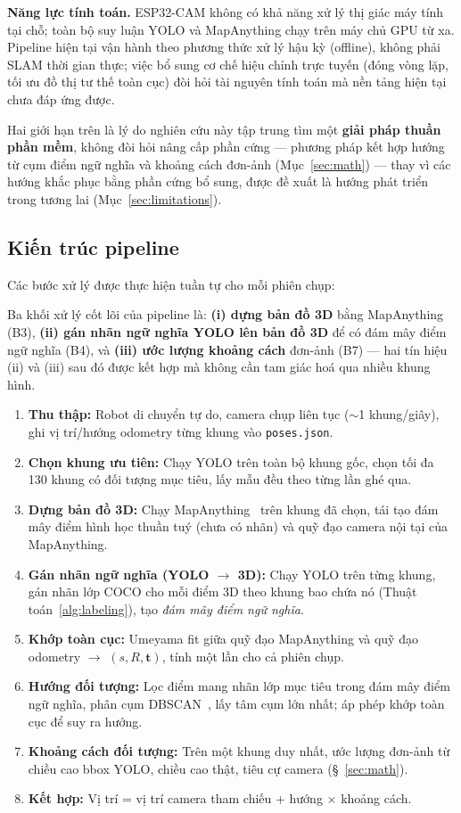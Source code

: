 \documentclass[10pt,a4paper,twocolumn]{article}
\begin{document}
\textbf{Năng lực tính toán.} ESP32-CAM không có khả năng xử lý thị giác máy tính tại chỗ; toàn bộ suy luận YOLO và MapAnything chạy trên máy chủ GPU từ xa. Pipeline hiện tại vận hành theo phương thức xử lý hậu kỳ (offline), không phải SLAM thời gian thực; việc bổ sung cơ chế hiệu chỉnh trực tuyến (đóng vòng lặp, tối ưu đồ thị tư thế toàn cục) đòi hỏi tài nguyên tính toán mà nền tảng hiện tại chưa đáp ứng được.

Hai giới hạn trên là lý do nghiên cứu này tập trung tìm một \textbf{giải pháp thuần phần mềm}, không đòi hỏi nâng cấp phần cứng — phương pháp kết hợp hướng từ cụm điểm ngữ nghĩa và khoảng cách đơn-ảnh (Mục~\ref{sec:math}) — thay vì các hướng khắc phục bằng phần cứng bổ sung, được đề xuất là hướng phát triển trong tương lai (Mục~\ref{sec:limitations}).

\subsection{Kiến trúc pipeline}

Các bước xử lý được thực hiện tuần tự cho mỗi phiên chụp:

Ba khối xử lý cốt lõi của pipeline là: \textbf{(i) dựng bản đồ 3D} bằng MapAnything (B3), \textbf{(ii) gán nhãn ngữ nghĩa YOLO lên bản đồ 3D} để có đám mây điểm ngữ nghĩa (B4), và \textbf{(iii) ước lượng khoảng cách} đơn-ảnh (B7) — hai tín hiệu (ii) và (iii) sau đó được kết hợp mà không cần tam giác hoá qua nhiều khung hình.

\begin{enumerate}[label=\textbf{B\arabic*.},leftmargin=*,itemsep=0.15em]
    \item \textbf{Thu thập:} Robot di chuyển tự do, camera chụp liên tục ($\sim$1 khung/giây), ghi vị trí/hướng odometry từng khung vào \texttt{poses.json}.
    \item \textbf{Chọn khung ưu tiên:} Chạy YOLO trên toàn bộ khung gốc, chọn tối đa 130 khung có đối tượng mục tiêu, lấy mẫu đều theo từng lần ghé qua.
    \item \textbf{Dựng bản đồ 3D:} Chạy MapAnything~\cite{mapanything} trên khung đã chọn, tái tạo đám mây điểm hình học thuần tuý (chưa có nhãn) và quỹ đạo camera nội tại của MapAnything.
    \item \textbf{Gán nhãn ngữ nghĩa (YOLO $\to$ 3D):} Chạy YOLO trên từng khung, gán nhãn lớp COCO cho mỗi điểm 3D theo khung bao chứa nó (Thuật toán~\ref{alg:labeling}), tạo \emph{đám mây điểm ngữ nghĩa}.
    \item \textbf{Khớp toàn cục:} Umeyama fit giữa quỹ đạo MapAnything và quỹ đạo odometry $\to$ $(s, R, \mathbf{t})$, tính một lần cho cả phiên chụp.
    \item \textbf{Hướng đối tượng:} Lọc điểm mang nhãn lớp mục tiêu trong đám mây điểm ngữ nghĩa, phân cụm DBSCAN~\cite{dbscan}, lấy tâm cụm lớn nhất; áp phép khớp toàn cục để suy ra hướng.
    \item \textbf{Khoảng cách đối tượng:} Trên một khung duy nhất, ước lượng đơn-ảnh từ chiều cao bbox YOLO, chiều cao thật, tiêu cự camera (\S~\ref{sec:math}).
    \item \textbf{Kết hợp:} Vị trí = vị trí camera tham chiếu + hướng $\times$ khoảng cách.
\end{enumerate}
\end{document}
